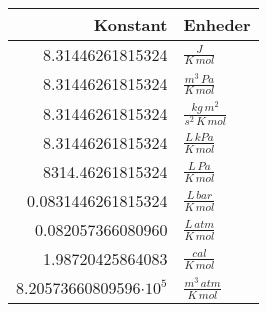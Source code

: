 \begin{tabular}{|r|l|}
	\hline
	Konstant&Enheder\\
	\hline
	8.31446261815324&$\frac{J}{K\,mol}$\\
	8.31446261815324&$\frac{m^3\,Pa}{K\,mol}$\\
	8.31446261815324&$\frac{kg\,m^2}{s^2\,K\,mol}$\\
	8.31446261815324&$\frac{L\,kPa}{K\,mol}$\\
	\hline
	8314.46261815324&$\frac{L\,Pa}{K\,mol}$\\
	0.0831446261815324&$\frac{L\,bar}{K\,mol}$\\
	0.082057366080960&$\frac{L\,atm}{K\,mol}$\\
	1.98720425864083&$\frac{cal}{K\,mol}$\\
	8.20573660809596$\cdot 10^5$&$\frac{m^3\,atm}{K\,mol}$\\
	\hline
\end{tabular}